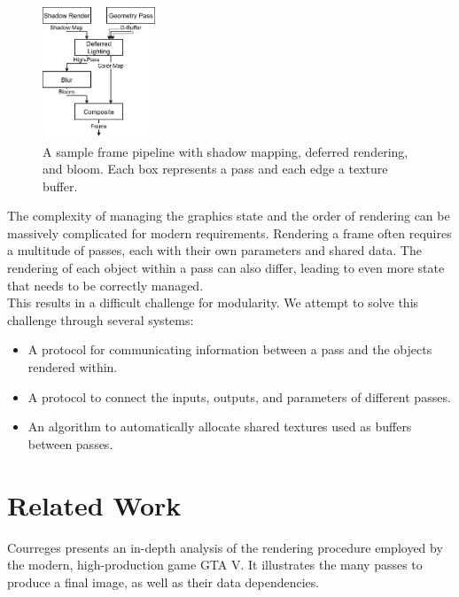 \documentclass[format=sigconf]{acmart}
\begin{document}
\begin{figure}[h]
  \begin{center}
    \includegraphics[width=0.3\textwidth]{render-pipeline.png}
  \end{center}
  \caption{A sample frame pipeline with shadow mapping, deferred rendering, and bloom. Each box represents a pass and each edge a texture buffer.}
  \label{fig:renderpipeline}
\end{figure}

The complexity of managing the graphics state and the order of rendering can be massively complicated for modern requirements. Rendering a frame often requires a multitude of passes, each with their own parameters and shared data. The rendering of each object within a pass can also differ, leading to even more state that needs to be correctly managed. \\

This results in a difficult challenge for modularity. We attempt to solve this challenge through several systems:

\begin{itemize}
\item A protocol for communicating information between a pass and the objects rendered within.
\item A protocol to connect the inputs, outputs, and parameters of different passes.
\item An algorithm to automatically allocate shared textures used as buffers between passes.
\end{itemize}

\section{Related Work}\label{relatedwork}
Courreges\cite{gtav} presents an in-depth analysis of the rendering procedure employed by the modern, high-production game GTA V. It illustrates the many passes to produce a final image, as well as their data dependencies. \\
\end{document}
